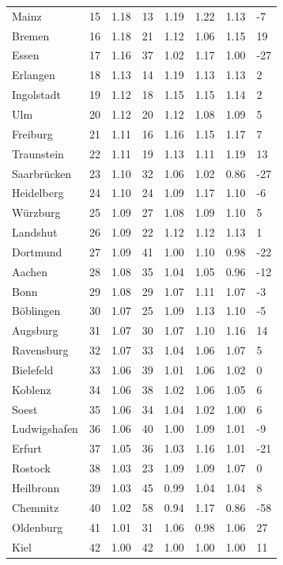 \documentclass[11pt,a4paper]{article}
\begin{document}
{\begin{longtable}{llllllll}
Mainz & 15 & 1.18 & 13 & 1.19 & 1.22 & 1.13 & -7 \\
Bremen & 16 & 1.18 & 21 & 1.12 & 1.06 & 1.15 & 19 \\
Essen & 17 & 1.16 & 37 & 1.02 & 1.17 & 1.00 & -27 \\
Erlangen & 18 & 1.13 & 14 & 1.19 & 1.13 & 1.13 & 2 \\
Ingolstadt & 19 & 1.12 & 18 & 1.15 & 1.15 & 1.14 & 2 \\
Ulm & 20 & 1.12 & 20 & 1.12 & 1.08 & 1.09 & 5 \\
Freiburg & 21 & 1.11 & 16 & 1.16 & 1.15 & 1.17 & 7 \\
Traunstein & 22 & 1.11 & 19 & 1.13 & 1.11 & 1.19 & 13 \\
Saarbrücken & 23 & 1.10 & 32 & 1.06 & 1.02 & 0.86 & -27 \\
Heidelberg & 24 & 1.10 & 24 & 1.09 & 1.17 & 1.10 & -6 \\
Würzburg & 25 & 1.09 & 27 & 1.08 & 1.09 & 1.10 & 5 \\
Landshut & 26 & 1.09 & 22 & 1.12 & 1.12 & 1.13 & 1 \\
Dortmund & 27 & 1.09 & 41 & 1.00 & 1.10 & 0.98 & -22 \\
Aachen & 28 & 1.08 & 35 & 1.04 & 1.05 & 0.96 & -12 \\
Bonn & 29 & 1.08 & 29 & 1.07 & 1.11 & 1.07 & -3 \\
Böblingen & 30 & 1.07 & 25 & 1.09 & 1.13 & 1.10 & -5 \\
Augsburg & 31 & 1.07 & 30 & 1.07 & 1.10 & 1.16 & 14 \\
Ravensburg & 32 & 1.07 & 33 & 1.04 & 1.06 & 1.07 & 5 \\
Bielefeld & 33 & 1.06 & 39 & 1.01 & 1.06 & 1.02 & 0 \\
Koblenz & 34 & 1.06 & 38 & 1.02 & 1.06 & 1.05 & 6 \\
Soest & 35 & 1.06 & 34 & 1.04 & 1.02 & 1.00 & 6 \\
Ludwigshafen & 36 & 1.06 & 40 & 1.00 & 1.09 & 1.01 & -9 \\
Erfurt & 37 & 1.05 & 36 & 1.03 & 1.16 & 1.01 & -21 \\
Rostock & 38 & 1.03 & 23 & 1.09 & 1.09 & 1.07 & 0 \\
Heilbronn & 39 & 1.03 & 45 & 0.99 & 1.04 & 1.04 & 8 \\
Chemnitz & 40 & 1.02 & 58 & 0.94 & 1.17 & 0.86 & -58 \\
Oldenburg & 41 & 1.01 & 31 & 1.06 & 0.98 & 1.06 & 27 \\
Kiel & 42 & 1.00 & 42 & 1.00 & 1.00 & 1.00 & 11 \\

\end{longtable}}
\end{document}
